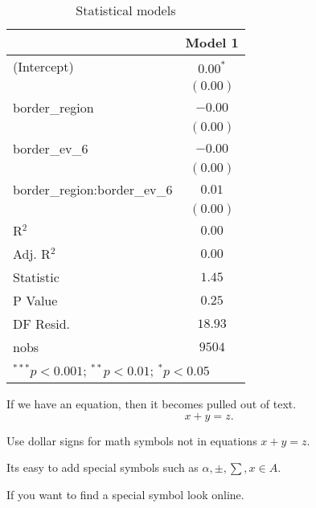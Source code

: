 \documentclass[12pt]{article}
\theoremstyle{definition}
\numberwithin{equation}{subsection}
\begin{document}
\begin{table}
\begin{center}
\begin{tabular}{l c}
\hline
 & Model 1 \\
\hline
(Intercept)                  & $0.00^{*}$ \\
                             & $(0.00)$   \\
border\_region               & $-0.00$    \\
                             & $(0.00)$   \\
border\_ev\_6                & $-0.00$    \\
                             & $(0.00)$   \\
border\_region:border\_ev\_6 & $0.01$     \\
                             & $(0.00)$   \\
\hline
R$^2$                        & $0.00$     \\
Adj. R$^2$                   & $0.00$     \\
Statistic                    & $1.45$     \\
P Value                      & $0.25$     \\
DF Resid.                    & $18.93$    \\
nobs                         & $9504$     \\
\hline
\multicolumn{2}{l}{\scriptsize{$^{***}p<0.001$; $^{**}p<0.01$; $^{*}p<0.05$}}
\end{tabular}
\caption{Statistical models}
\label{table:coefficients}
\end{center}
\end{table}

If we have an equation, then it becomes pulled out of text.
\begin{equation*}
x + y = z.
\end{equation*}

Use dollar signs for math symbols not in equations $x+y = z$.

Its easy to add special symbols such as $\alpha, \pm, \sum, x \in A$.  

If you want to find a special symbol look online.  
\end{document}

